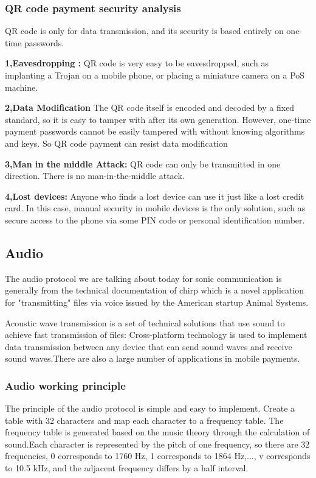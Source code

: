 \documentclass[journal]{IEEEtran}
\begin{document}
\subsubsection{QR code payment security analysis}
QR code is only for data transmission, and its security is based entirely on one-time passwords.

\textbf{1,Eavesdropping :} QR code is very easy to be eavesdropped, such as implanting a Trojan on a mobile phone, or placing a miniature camera on a PoS machine. 


\textbf{2,Data Modification}
The QR code itself is encoded and decoded by a fixed standard, so it is easy to tamper with after its own generation. However, one-time payment passwords cannot be easily tampered with without knowing algorithms and keys. So QR code payment can resist data modification

\textbf{3,Man in the middle Attack:} QR code can only be transmitted in one direction. There is no man-in-the-middle attack.



\textbf{4,Lost devices:}
Anyone who finds a lost device can use it just like a lost credit card. In this case, manual security in mobile devices is the only solution, such as secure access to the phone via some PIN code or personal identification number.




\subsection{Audio}

The audio protocol we are talking about today for sonic communication is generally from the technical documentation of chirp which is a novel application for "transmitting" files via voice issued by the American startup Animal Systems.

Acoustic wave transmission is a set of technical solutions that use sound to achieve fast transmission of files: Cross-platform technology is used to implement data transmission between any device that can send sound waves and receive sound waves.There are also a large number of applications in mobile payments.

\subsubsection{Audio working principle}
The principle of the audio protocol is simple and easy to implement. Create a table with 32 characters and map each character to a frequency table. The frequency table is generated based on the music theory through the calculation of sound.Each character is represented by the pitch of one frequency, so there are 32 frequencies, 0 corresponds to 1760 Hz, 1 corresponds to 1864 Hz,..., v corresponds to 10.5 kHz, and the adjacent frequency differs by a half interval.
\end{document}
